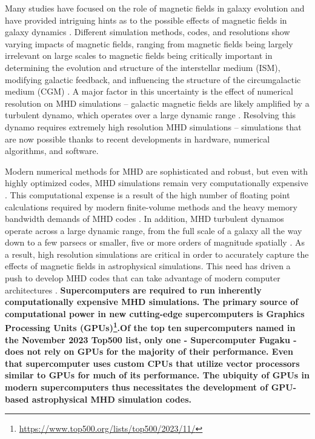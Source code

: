 \documentclass[modern, linenumbers]{aastex631}
\begin{document}
Many studies have focused on the role of magnetic fields in galaxy evolution and have provided intriguing hints as to the possible effects of magnetic fields in galaxy dynamics \citep{shin_2008, banda_2016, grand_auriga_2017, pakmor_magnetic_2017, hopkins_but_2020, wibking_2021}. Different simulation methods, codes, and resolutions show varying impacts of magnetic fields, ranging from magnetic fields being largely irrelevant on large scales to magnetic fields being critically important in determining the evolution and structure of the interstellar medium (ISM), modifying galactic feedback, and influencing the structure of the circumgalactic medium (CGM) \citep{martin-alvarez_how_2020, dobbs_magnetic_2007, kim_vertical_2015, hanasz_global_2009, pakmor_simulations_2013, banda_2017}. A major factor in this uncertainty is the effect of numerical resolution on MHD simulations -- galactic magnetic fields are likely amplified by a turbulent dynamo, which operates over a large dynamic range \citep{martin-alvarez_three-phase_2018, beck_1996, gent_2021, carteret_2022, brandenburg_2023}. Resolving this dynamo requires extremely high resolution MHD simulations -- simulations that are now possible thanks to recent developments in hardware, numerical algorithms, and software.

Modern numerical methods for MHD are sophisticated and robust, but even with highly optimized codes, MHD simulations remain very computationally expensive \citep{athena++_2020}. This computational expense is a result of the high number of floating point calculations required by modern finite-volume methods and the heavy memory bandwidth demands of MHD codes \citep{k_athena_2021}. In addition, MHD turbulent dynamos operate across a large dynamic range, from the full scale of a galaxy all the way down to a few parsecs or smaller, five or more orders of magnitude spatially \citep{pariev_magnetic_1_2007, pariev_magnetic_2_2007, ntormousi_dynamo_2020, galishnikova_tearing_2022}. As a result, high resolution simulations are critical in order to accurately capture the effects of magnetic fields in astrophysical simulations. This need has driven a push to develop MHD codes that can take advantage of modern computer architectures \citep[e.g.][]{schive_gamer-2_2018, almgren_castro_2020, zingale_castro_2020, shankar_gram-x_2022, liska_h-amr_2022, begue_cuharm_2023, holmen_early_2023, parthenon_2023}. \textbf{Supercomputers are required to run inherently computationally expensive MHD simulations. The primary source of computational power in new cutting-edge supercomputers is Graphics Processing Units (GPUs)\footnote{\url{https://www.top500.org/lists/top500/2023/11/}}.Of the top ten supercomputers named in the November 2023 Top500 list, only one - Supercomputer Fugaku - does not rely on GPUs for the majority of their performance. Even that supercomputer uses custom CPUs that utilize vector processors similar to GPUs for much of its performance. The ubiquity of GPUs in modern supercomputers thus necessitates the development of GPU-based astrophysical MHD simulation codes.}
\end{document}

